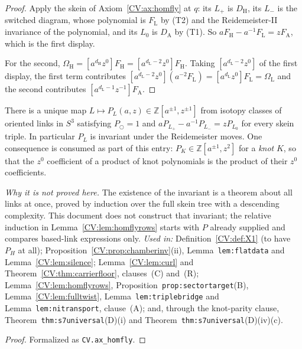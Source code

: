 \begin{proof}\leanok{}
Apply the skein of Axiom~\ref{CV:ax:homfly} at $q$: its $L_+$ is $D_{\mathrm H}$,
its $L_-$ is the switched diagram, whose polynomial is $F_{\mathrm L}$ by (T2)
and the Reidemeister-II invariance of the polynomial, and its $L_0$ is
$D_{\mathrm A}$ by (T1). So $aF_{\mathrm H}-a^{-1}F_{\mathrm L}=zF_{\mathrm A}$,
which is the first display.

For the second, $\Omega_{\mathrm H}=[a^{d_{\mathrm H}}z^0]F_{\mathrm H}
=[a^{d_{\mathrm L}-2}z^0]F_{\mathrm H}$. Taking $[a^{d_{\mathrm L}-2}z^0]$ of
the first display, the first term contributes
$[a^{d_{\mathrm L}-2}z^0](a^{-2}F_{\mathrm L})
=[a^{d_{\mathrm L}}z^0]F_{\mathrm L}=\Omega_{\mathrm L}$ and the second
contributes $[a^{d_{\mathrm L}-1}z^{-1}]F_{\mathrm A}$.
\end{proof}

\begin{theorem}\label{CV:ax:homfly}\leanok
There is a unique map $L\mapsto P_L(a,z)\in\mathbb Z[a^{\pm1},z^{\pm1}]$ from
isotopy classes of oriented links in $S^3$ satisfying
$P_{\bigcirc}=1$ and $aP_{L_+}-a^{-1}P_{L_-}=zP_{L_0}$ for every skein triple.
In particular $P_L$ is invariant under the Reidemeister moves. One consequence
is consumed as part of this entry: $P_K\in\mathbb Z[a^{\pm1},z^2]$ for a
\emph{knot} $K$, so that the $z^0$ coefficient of a product of knot
polynomials is the product of their $z^0$ coefficients.

\emph{Why it is not proved here.} The existence of the invariant is a theorem
about all links at once, proved by induction over the full skein tree with a
descending complexity. This document does not construct that invariant; the relative induction in
Lemma~\ref{CV:lem:homflyrows} starts with $P$ already supplied and compares
based-link expressions only.
\emph{Used in:} Definition~\ref{CV:def:X1} (to have $P_H$ at all);
Proposition~\ref{CV:prop:chamberinv}(ii), Lemma~\texttt{lem:flatdata} and
Lemma~\ref{CV:lem:silence}; Lemma~\ref{CV:lem:curl} and Theorem~\ref{CV:thm:carrierfloor},
clauses~(C) and~(R); Lemma~\ref{CV:lem:homflyrows},
Proposition~\texttt{prop:sectortarget}(B), Lemma~\ref{CV:lem:fulltwist},
Lemma~\texttt{lem:triplebridge} and Lemma~\texttt{lem:nitransport}, clause~(A); and, through the
knot-parity clause, Theorem~\texttt{thm:s7universal}(D)(i) and
Theorem~\texttt{thm:s7universal}(D)(iv)(c).
\end{theorem}
\begin{proof}\leanok{}
Formalized as \texttt{CV.ax\_homfly}.
\end{proof}

